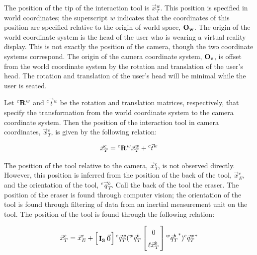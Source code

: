 \documentclass{article}
\newcommand{\mat}[2][ccccccccccccccccccccccccccccccccccccccccccccc]{\left[
        \arraycolsep=1.2pt\def\arraystretch{1.5}
        \begin{array}{#1} #2 \\ 
        \end{array} 
        \right]}
\newcommand{\xbT}{\vec{x}{^b_T}} %
\newcommand{\xwT}{\vec{x}{^w_T}} %
\newcommand{\xcT}{\vec{x}{^c_T}} %
\newcommand{\xcE}{\vec{x}{^c_E}} %
\newcommand{\q}[3]{{^#1}\vec{q}{^#2_#3}} %
\newcommand{\R}[2]{{^#1}{\bf{R}}{^#2}}
\newcommand{\T}[2]{{^#1}{\vec{t}}{^#2}}
\begin{document}
\begin{flushleft}


\medskip

The position of the tip of the interaction tool is $ \xwT $. This position is specified in world coordinates; the superscript $w$ indicates that the coordinates of this position are specified relative to the origin of world space, $\bf{O_w}$. The origin of the world coordinate system is the head of the user who is wearing a virtual reality display. This is not exactly the position of the camera, though the two coordinate systems correspond. The origin of the camera coordinate system, $\bf{O_c}$, is offset from the world coordinate system by the rotation and translation of the user's head. The rotation and translation of the user's head will be minimal while the user is seated. 

\medskip

Let $\R{c}{w}$ and $\T{c}{w}$ be the rotation and translation matrices, respectively, that specify the transformation from the world coordinate system to the camera coordinate system. Then the position of the interaction tool in camera coordinates, $ \xcT $,  is given by the following relation: 

\[ \xcT = \R{c}{w} \xwT + \T{c}{w} \]

The position of the tool relative to the camera, $ \xcT $, is not observed directly. However, this position is inferred from the position of the back of the tool, $ \xcE $, and the orientation of the tool, $ \q{c}{b}{T} $. Call the back of the tool the eraser. The position of the eraser is found through computer vision; the orientation of the tool is found through filtering of data from an inertial measurement unit on the tool. The position of the tool is found through the following relation: 

\[ \xcT = \xcE + \mat{ \bf{I_3} & \vec{0} }\q{c}{w}{T} ( \q{w}{b}{T} \mat{ 0 \\ \ell \xbT} \q{w}{b}{T}^{*} ) \q{c}{w}{T}^{*} \]


\medskip
\medskip






\end{flushleft}
\end{document}
